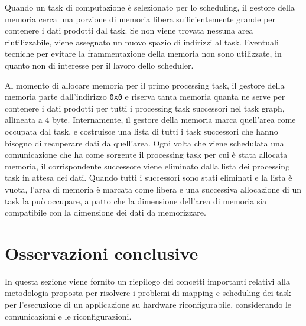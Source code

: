 Quando un task di computazione è selezionato per lo scheduling, il gestore 
della memoria cerca una porzione di memoria libera sufficientemente grande
per contenere i dati prodotti dal task. Se non viene 
trovata nessuna area riutilizzabile, viene assegnato un nuovo spazio di 
indirizzi al task. Eventuali tecniche per evitare la frammentazione della 
memoria non sono utilizzate, in quanto non di interesse per il lavoro dello 
scheduler.

Al momento di allocare memoria per il primo processing task, il gestore della 
memoria parte dall'indirizzo \verb+0x0+ e riserva tanta memoria quanta ne 
serve per contenere i dati prodotti per tutti i processing task successori nel 
task graph, allineata a $4$ byte. Internamente, il gestore della memoria marca 
quell'area come occupata dal task, e costruisce una lista di tutti i task 
successori che hanno bisogno di recuperare dati da quell'area.
Ogni volta che viene schedulata una comunicazione che ha come sorgente il processing
task per cui è stata allocata memoria, il corrispondente successore 
viene eliminato dalla lista dei processing task in attesa dei dati. Quando 
tutti i successori sono stati eliminati e la lista è vuota, l'area di memoria è 
marcata come libera e una successiva allocazione di un task la può occupare, a 
patto che la dimensione dell'area di memoria sia compatibile con la dimensione dei
dati da memorizzare.


\section{Osservazioni conclusive}
\label{sec:osservazioniConclusive}
In questa sezione viene fornito un riepilogo dei concetti importanti relativi 
alla metodologia proposta per risolvere i problemi di mapping e scheduling dei task 
per l'esecuzione di un applicazione su hardware riconfigurabile, considerando 
le comunicazioni e le riconfigurazioni.

